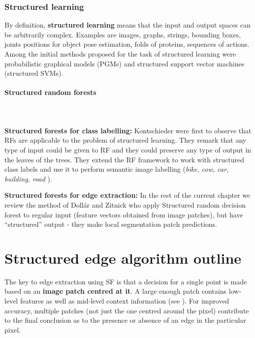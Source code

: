 \subsubsection{Structured learning}
By definition, {\bf structured learning} means that the input and output spaces can be arbitrarily complex. Examples are images, graphs, strings, bounding boxes, joints positions for object pose estimation, folds of proteins, sequences of actions. Among the initial methods proposed for the task of structured learning were probabilistic graphical models (PGMs) and structured support vector machines (structured SVMs).

\paragraph{Structured random forests}\mbox{}\\\mbox{}\\
\textbf{Structured forests for class labelling:} Kontschieder \etal \cite{KontschiederBBP11} were first to observe that RFs are applicable to the problem of structured learning. They remark that any type of input could be given to RF and they could preserve %
any type of output in the leaves of the trees. They extend the RF framework to work with structured class labels and use it to perform semantic image labelling (\textit{bike, cow, car, building, road \etc}).

\textbf{Structured forests for edge extraction:} In the rest of the current chapter %
we review the method of Doll{\'a}r and Zitnick \cite{DollarICCV13edges,Dollar2015PAMI} who apply Structured random decision forest to regular input (feature vectors obtained from image patches), but have ``structured'' output - they make local segmentation patch predictions.

\section{Structured edge algorithm outline}
The key to edge extraction using SF is that a decision for a single point is made based on an {\bf image patch centred at it}. A large enough patch contains low-level features as well as mid-level context information (see ). For improved accuracy, multiple patches (not just the one centred around the pixel) contribute to the final conclusion as to the presence or absence of an edge in the particular pixel. %

